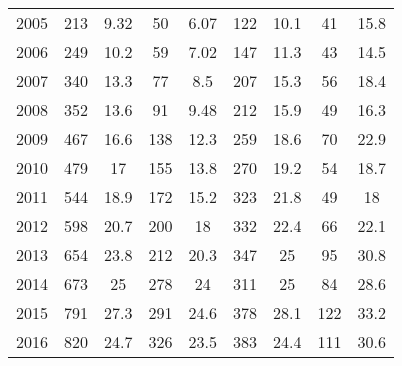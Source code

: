 \begin{table}[htbp]
\begin{tabular}{l*{8}{c}}
2005      &      213&     9.32&       50&     6.07&      122&     10.1&       41&     15.8\\
2006      &      249&     10.2&       59&     7.02&      147&     11.3&       43&     14.5\\
2007      &      340&     13.3&       77&      8.5&      207&     15.3&       56&     18.4\\
2008      &      352&     13.6&       91&     9.48&      212&     15.9&       49&     16.3\\
2009      &      467&     16.6&      138&     12.3&      259&     18.6&       70&     22.9\\
2010      &      479&       17&      155&     13.8&      270&     19.2&       54&     18.7\\
2011      &      544&     18.9&      172&     15.2&      323&     21.8&       49&       18\\
2012      &      598&     20.7&      200&       18&      332&     22.4&       66&     22.1\\
2013      &      654&     23.8&      212&     20.3&      347&       25&       95&     30.8\\
2014      &      673&       25&      278&       24&      311&       25&       84&     28.6\\
2015      &      791&     27.3&      291&     24.6&      378&     28.1&      122&     33.2\\
2016      &      820&     24.7&      326&     23.5&      383&     24.4&      111&     30.6\\
\hline\hline
\end{tabular}
\end{table}
